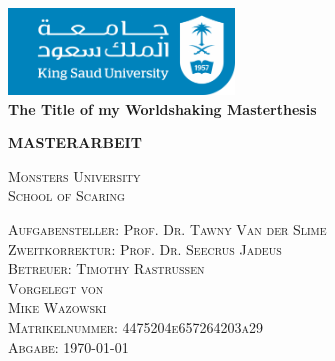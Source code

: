 \begin{titlepage}
\begin{singlespace}


\setlength{\hoffset}{-5mm} 
\setlength{\voffset}{-15mm}

\begin{center}

\includegraphics[width=6cm]{images/ksu.png}\\

\vspace{1.5cm}
\LARGE
\textbf{The Title of my Worldshaking Masterthesis}\\

\vspace{1.5cm}

\large
\textbf{MASTERARBEIT}\\
\vspace{1.5cm}

\large
\textsc{
Monsters University\\
School of Scaring}\\

\vspace{1.5cm}

\textsc{Aufgabensteller: Prof. Dr. Tawny Van der Slime}\\
\smallskip
\textsc{Zweitkorrektur: Prof. Dr. Seecrus Jadeus}\\
\smallskip
\textsc{Betreuer: Timothy Rastrussen}\\


\vspace{1cm}
\textsc{Vorgelegt von\\
Mike Wazowski\\
Matrikelnummer: 4475204e657264203a29}\\

\vspace{1cm}
\textsc{Abgabe: \today}\\ %

\end{center}

\clearpage
\setlength{\hoffset}{0mm}
\end{singlespace}
\end{titlepage}
